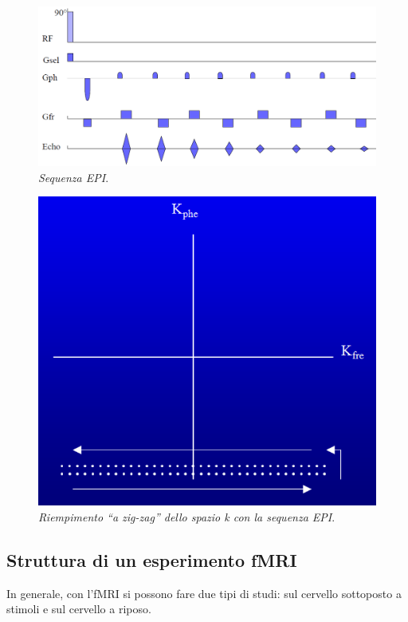 \documentclass{report}
\newcommand{\virgolette}[1]{``#1''}
\numberwithin{equation}{section}
\numberwithin{figure}{section}
\begin{document}
\vspace{10 pt}

\begin{figure}[htp]
\centering
\includegraphics[scale=0.65]{immagini/epi.png}
\caption{\label{fig:epi} \textit{Sequenza EPI}.}
\end{figure}

\vspace{10 pt}

\begin{figure}[htp]
\centering
\includegraphics[scale=0.68]{immagini/kepi.png}
\caption{\label{fig:kepi} \textit{Riempimento \virgolette{a zig-zag} dello spazio k con la sequenza EPI}.}
\end{figure}

\newpage

\subsection{Struttura di un esperimento fMRI}
In generale, con l'fMRI si possono fare due tipi di studi: sul cervello sottoposto a stimoli e sul cervello a riposo.
\end{document}
